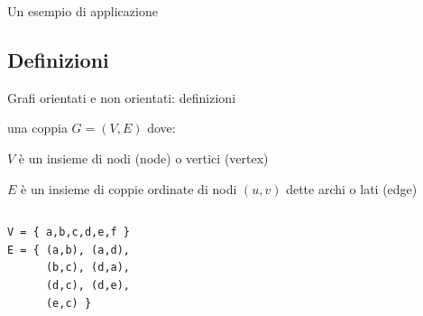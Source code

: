 \begin{frame}{Un esempio di applicazione}


\pause
\bigskip
{}

\end{frame}



\subsection{Definizioni}

\begin{frame}[fragile]{Grafi orientati e non orientati: definizioni}

\vspace{-9pt}
\begin{myboxtitle}
\EE una coppia $G=(V,E)$ dove: 
\BI
\item $V$ è un insieme di \alert{nodi} (\alert{node}) o \alert{vertici} (\alert{vertex})
\item $E$ è un insieme di coppie ordinate di nodi $(u,v)$  dette \alert{archi} o \alert{lati} (\alert{edge})
\EI
\end{myboxtitle}

\begin{columns}[T]
\begin{lstlisting}
V = { a,b,c,d,e,f }
E = { (a,b), (a,d),
      (b,c), (d,a),
      (d,c), (d,e),
      (e,c) }
\end{lstlisting}
\vspace{-9pt}
\end{columns}

\end{frame}

